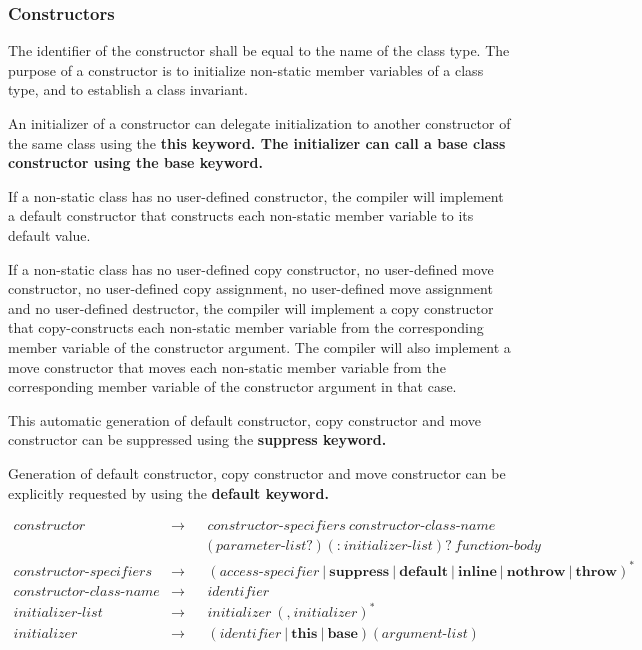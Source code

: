 \documentclass[a4paper,oneside,11pt]{article}
\begin{document}
\subsubsection{Constructors}\label{constructor}

The identifier of the constructor shall be equal to the name of the class type.
The purpose of a constructor is to initialize non-static member variables of a class type,
and to establish a class invariant.

An initializer of a constructor can delegate initialization to another constructor of
the same class using the \bf{this} keyword.
The initializer can call a base class constructor using the \bf{base} keyword.

If a non-static class has no user-defined constructor, the compiler will implement a default constructor that constructs
each non-static member variable to its default value.

If a non-static class has no user-defined copy constructor,
no user-defined move constructor, no user-defined copy assignment, no user-defined move assignment and no user-defined destructor,
the compiler will implement a copy constructor that
copy-constructs each non-static member variable from the corresponding member variable of the constructor argument.
The compiler will also implement a move constructor that moves each non-static member variable from the corresponding
member variable of the constructor argument in that case.

This automatic generation of default constructor, copy constructor and move constructor can be suppressed using the \bf{suppress} keyword.

Generation of default constructor, copy constructor and move constructor can be explicitly requested by using the \bf{default} keyword.

\begin{align*}
constructor &\rightarrow & &constructor\textrm{-}specifiers \> constructor\textrm{-}class\textrm{-}name\\
& & &\texttt{(} \> \hyperref[parameterlist]{parameter\textrm{-}list}? \> \texttt{)} \> (\texttt{:} \> initializer\textrm{-}list)? \>
\hyperref[functionbody]{function\textrm{-}body}\\
constructor\textrm{-}specifiers &\rightarrow & &(\hyperref[accessspecifier]{access\textrm{-}specifier} \> | \>
\textbf{suppress} \> | \> \textbf{default} \> | \> \textbf{inline} \> | \> \textbf{nothrow} \> | \> \textbf{throw})^*\\
constructor\textrm{-}class\textrm{-}name &\rightarrow & &\hyperref[identifier]{identifier}\\
initializer\textrm{-}list &\rightarrow & &initializer \> (\texttt{,} \> initializer)^*\\
initializer &\rightarrow & &(\hyperref[identifier]{identifier} \> | \> \textbf{this} \> | \> \textbf{base}) \> \texttt{(} \>
\hyperref[argumentlist]{argument\textrm{-}list} \> \texttt{)}
\end{align*}
\end{document}
